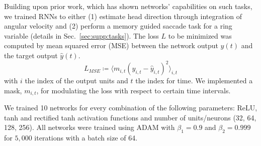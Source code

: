 \documentclass{article} %
\newcounter{ct}
\theoremstyle{definition}
\theoremstyle{remark}
\begin{document}
Building upon prior work, which has shown networks' capabilities on such tasks, we trained RNNs to either
(1) estimate head direction through integration of angular velocity \citep{cueva2019headdirection, cueva2021continuous}
and (2) perform a memory guided saccade task for a ring variable \citep{wimmer2014} (details in Sec.~\ref{sec:supp:tasks}).
The loss $L$ to be minimized was computed by mean squared error (MSE) between the network output $y(t)$ and the target output $\hat y(t)$.
\begin{equation}\label{eq:loss}
L_{MSE} \coloneqq \langle m_{i,t}(y_{i,t}-\hat y_{i,t})^2\rangle_{i,t}
\end{equation}
with $i$ the index of the output units and $t$  the index for time.
We implemented a mask, $m_{i,t}$, for modulating the loss with respect to certain time intervals.


We trained 10 networks for every combination of the following parameters:
 ReLU, tanh and rectified tanh activation functions and
 number of units/neurons (32, 64, 128, 256).
%
All networks were trained using ADAM with $\beta_1=0.9$ and $\beta_2=0.999$ for $5,000$ iterations with a batch size of 64.  %



\end{document}
